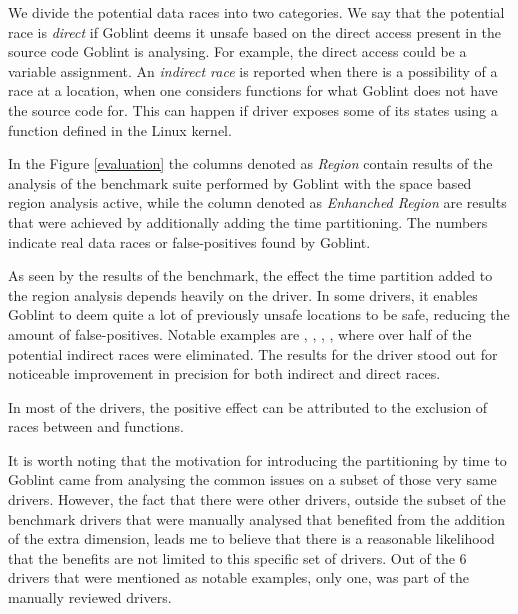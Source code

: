 \documentclass[..thesis.tex]{subfiles}
\begin{document}
We divide the potential data races into two categories. We say that the potential race is \textit{direct} if Goblint deems it unsafe based on the direct access present in the source code
Goblint is analysing. For example, the direct access could be a variable assignment.
An \textit{indirect race} is reported when there is a possibility of a race at a location, when one considers functions for what Goblint does not have the source code for.
This can happen if driver exposes some of its states using a function defined in the Linux kernel.   

In the Figure \ref{evaluation} the columns denoted as \textit{Region} contain results of the analysis of the benchmark suite performed by Goblint with the space based region analysis active,
while the column denoted as \textit{Enhanched Region} are results that were achieved by additionally adding the time partitioning.
The numbers indicate real data races or false-positives found by Goblint.

As seen by the results of the benchmark, the effect the time partition added to the region analysis depends heavily on the driver.
In some drivers, it enables Goblint to deem quite a lot of previously unsafe locations to be safe, reducing the amount of false-positives.
Notable examples are , , , ,
where over half of the potential indirect races were eliminated. The results for the driver  stood out for noticeable improvement in precision for both indirect and direct races.

In most of the drivers, the positive effect can be attributed to the exclusion of races between  and  functions. 

It is worth noting that the motivation for introducing the partitioning by time to Goblint came from analysing the common issues on a subset of those very same drivers.
However, the fact that there were other drivers, outside the subset of the benchmark drivers that were manually analysed
that benefited from the addition of the extra dimension, leads me to believe that there is a reasonable likelihood
that the benefits are not limited to this specific set of drivers. Out of the 6 drivers that were mentioned as notable examples, only one,
 was part of the manually reviewed drivers.

\end{document}
